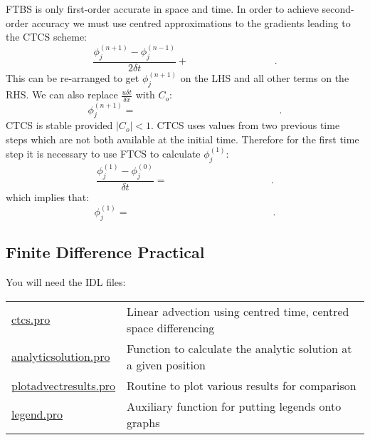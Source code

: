 FTBS is only first-order accurate in space and time. In order to achieve second-order accuracy we must use centred approximations to the gradients leading to the CTCS scheme:
\begin{equation}
\frac{\phi^{(n+1)}_j - \phi^{(n-1)}_j}{2\delta t} + ~~~~~~~~~~~~~~~~~~~~~~~~~~~~~~~~~~~~~~~.
\end{equation}
This can be re-arranged to get $\phi^{(n+1)}_j$ on the LHS and all other terms on the RHS. We can also replace $\frac{u\delta t}{\delta x}$ with $C_o$:
\begin{equation}
\phi^{(n+1)}_j = ~~~~~~~~~~~~~~~~~~~~~~~~~~~~~~~~~~~~~~~~~~~~~~~~~~~~~~~~~~~~~~~~~.
\end{equation}
CTCS is stable provided $|C_o|<1$. CTCS uses values from two previous time steps which are not both available at the initial time. Therefore for the first time step it is necessary to use FTCS to calculate $\phi^{(1)}_j$:
\begin{equation}
\frac{\phi^{(1)}_j -\phi^{(0)}_j}{\delta t} = ~~~~~~~~~~~~~~~~~~~~~~~~~~~~~~~~~~~~~~~~~~~~~~~.
\end{equation}
which implies that:
\begin{equation}
\phi^{(1)}_j = ~~~~~~~~~~~~~~~~~~~~~~~~~~~~~~~~~~~~~~~~~~~~~~~~~~~~~~~~~~~~~~~~~.
\end{equation}

\subsection{Finite Difference Practical}

You will need the IDL files:\\
\begin{tabularx}{\linewidth}{lL}
\url{ctcs.pro} & Linear advection using centred time, centred space differencing\\
\url{analyticsolution.pro} & Function to calculate the analytic solution at a given position\\
\url{plotadvectresults.pro} & Routine to plot various results for comparison \\
\url{legend.pro} & Auxiliary function for putting legends onto graphs \\
\end{tabularx}\\

